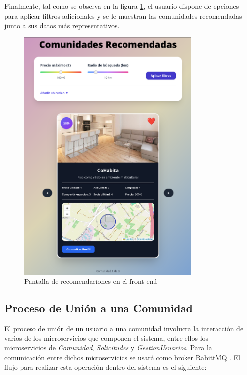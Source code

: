 Finalmente, tal como se observa en la figura \ref{fig:frontend-recomendador}, el usuario dispone de opciones para aplicar filtros adicionales y se le muestran las comunidades recomendadas junto a sus datos más representativos.
\vspace{0.5em}
\begin{figure}[H]
  \centering
  \includegraphics[width=0.8\textwidth]{fotos/frontend-recomendador.png}
  \caption{Pantalla de recomendaciones en el front-end}
  \label{fig:frontend-recomendador}
\end{figure}

\subsection{Proceso de Unión a una Comunidad}

El proceso de unión de un usuario a una comunidad involucra la interacción de varios de los microservicios que componen el sistema, entre ellos los microservicios de \textit{Comunidad}, \textit{Solicitudes} y \textit{GestionUsuarios}.
Para la comunicación entre dichos microservicios se usará como broker RabittMQ \cite{rabbitmq}. El flujo para realizar esta operación dentro del sistema es el siguiente:

